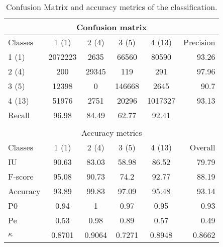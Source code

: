\begin{table}[H]
\begin{center}
\footnotesize
\begin{tabular}{|l|c|c|c|c|r|}
\hline
\multicolumn{6}{|c|}{Confusion matrix} \\
\hline
 Classes & 1 (1) & 2 (4) & 3 (5) & 4 (13) & Precision \\
\hline
1 (1) & 2072223 & 2635 & 66560 & 80590 & 93.26 \\
\hline
2 (4) & 200 & 29345 & 119 & 291 & 97.96 \\
\hline
3 (5) & 12398 & 0 & 146668 & 2645 & 90.7 \\
\hline
4 (13) & 51976 & 2751 & 20296 & 1017327 & 93.13 \\
\hline
Recall & 96.98 & 84.49 & 62.77 & 92.41 &  \\
\hline
\multicolumn{6}{c}{ } \\
\hline
\multicolumn{6}{|c|}{Accuracy metrics} \\
\hline
 Classes & 1 (1) & 2 (4) & 3 (5) & 4 (13) & Overall \\
\hline
IU & 90.63 & 83.03 & 58.98 & 86.52 & 79.79 \\
\hline
F-score & 95.08 & 90.73 & 74.2 & 92.77 & 88.19 \\
\hline
Accuracy & 93.89 & 99.83 & 97.09 & 95.48 & 93.14 \\
\hline
P0 & 0.94 & 1 & 0.97 & 0.95 & 0.93 \\
\hline
Pe & 0.53 & 0.98 & 0.89 & 0.57 & 0.49 \\
\hline
$\kappa$ & 0.8701 & 0.9064 & 0.7271 & 0.8948 & 0.8662 \\
\hline
\end{tabular}
\caption{Confusion Matrix and accuracy metrics of the classification.}
\label{table:}
\end{center}
\end{table}
